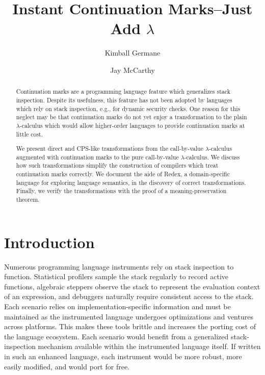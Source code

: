 \documentclass{llncs}
\title{Instant Continuation Marks--Just Add $\lambda$}
\author{Kimball Germane \and Jay McCarthy}
\institute{Brigham Young University}
\begin{document}
\maketitle

\begin{abstract}
Continuation marks are a programming language feature which generalizes stack inspection. Despite its usefulness, this feature has not been adopted by languages which rely on stack inspection, e.g., for dynamic security checks. One reason for this neglect may be that continuation marks do not yet enjoy a transformation to the plain $\lambda$-calculus which would allow higher-order languages to provide continuation marks at little cost.

We present direct and CPS-like transformations from the call-by-value $\lambda$-calculus augmented with continuation marks to the pure call-by-value $\lambda$-calculus. We discuss how such transformations simplify the construction of compilers which treat continuation marks correctly. We document the aide of Redex, a domain-specific language for exploring language semantics, in the discovery of correct transformations. Finally, we verify the transformations with the proof of a meaning-preservation theorem.
\end{abstract}

\section{Introduction}


Numerous programming language instruments rely on stack inspection to function. Statistical profilers sample the stack regularly to record active functions, algebraic steppers observe the stack to represent the evaluation context of an expression, and debuggers naturally require consistent access to the stack. Each scenario relies on implementation-specific information and must be maintained as the instrumented language undergoes optimizations and ventures across platforms. This makes these tools brittle and increases the porting cost of the language ecosystem. Each scenario would benefit from a generalized stack-inspection mechanism available within the instrumented language itself. If written in such an enhanced language, each instrument would be more robust, more easily modified, and would port for free.
\end{document}
